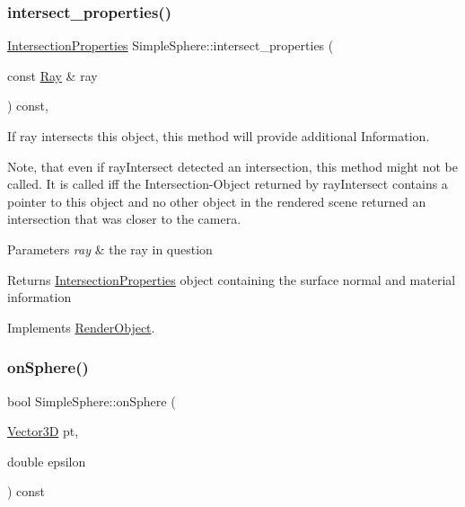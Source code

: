 \mbox{\label{classSimpleSphere_a4c71f3e8197f40c18cee7508f2fd3e9c}} 
\subsubsection{\texorpdfstring{intersect\_properties()}{intersect\_properties()}}
{\footnotesize\ttfamily \mbox{\hyperlink{classIntersectionProperties}{Intersection\+Properties}} Simple\+Sphere\+::intersect\+\_\+properties (\begin{DoxyParamCaption}\item[{const \mbox{\hyperlink{classRay}{Ray}} \&}]{ray }\end{DoxyParamCaption}) const\hspace{0.3cm}{\ttfamily [override]}, {\ttfamily [virtual]}}



If ray intersects this object, this method will provide additional Information. 

Note, that even if ray\+Intersect detected an intersection, this method might not be called. It is called iff the Intersection-\/\+Object returned by ray\+Intersect contains a pointer to this object and no other object in the rendered scene returned an intersection that was closer to the camera.


\begin{DoxyParams}{Parameters}
{\em ray} & the ray in question \\
\hline
\end{DoxyParams}
\begin{DoxyReturn}{Returns}
\mbox{\hyperlink{classIntersectionProperties}{Intersection\+Properties}} object containing the surface normal and material information 
\end{DoxyReturn}


Implements \mbox{\hyperlink{classRenderObject_a792d36570e3264530872187ca1b0baca}{Render\+Object}}.

\mbox{\label{classSimpleSphere_a208080863a70c6209689a6b4369a7b8b}} 
\subsubsection{\texorpdfstring{onSphere()}{onSphere()}}
{\footnotesize\ttfamily bool Simple\+Sphere\+::on\+Sphere (\begin{DoxyParamCaption}\item[{\mbox{\hyperlink{classVector3D}{Vector3D}}}]{pt,  }\item[{double}]{epsilon }\end{DoxyParamCaption}) const}

